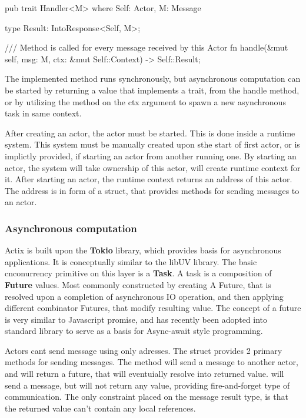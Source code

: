 \begin{code}[language=rust,label={handler_trait},caption={Handler trait}]
    pub trait Handler<M> where Self: Actor, M: Message
    {
    type Result: IntoResponse<Self, M>;

    /// Method is called for every message received by this Actor
    fn handle(&mut self, msg: M, ctx: &mut Self::Context) -> Self::Result;

    }
\end{code}

The implemented  method runs synchronously, but asynchronous computation
can be started by returning a value that implements a   trait, from the handle method, or by utilizing the 
method on the ctx argument to spawn a new asynchronous task in same context.

After creating an actor, the actor must be started. This is done inside a runtime system. This system must be manually created
upon sthe start of first actor, or is implictly provided, if starting an actor from another running one. By starting
an actor, the system will take ownership of this actor, will create runtime context for it. After starting an actor, the runtime
context returns an address of this actor. The address is in form of a struct, that provides methods for sending messages to
an actor.

\subsubsection{Asynchronous computation}
Actix is built upon the \textbf{Tokio} library, which provides basis for asynchronous applications. It is conceptually similar
to the libUV library. The basic cnconurrency primitive on this layer is a \textbf{Task}. A task is a composition
of \textbf{Future} values. Most commonly constructed by creating A Future, that is resolved upon a completion of asynchronous
IO operation, and then applying different combinator Futures, that modify resulting value. The concept of a future is very similar
to Javascript promise, and has recently been adopted into standard library to serve as a basis for Async-await style programming.

Actors cant send message using only adresses. The  struct provides 2 primary methods for sending messages.
The  method will send a message to another actor, and will return a future, that will eventuially resolve into
returned value.  will send a message, but will not return any value, providing fire-and-forget type of
communication. The only constraint placed on the message result type, is that the returned value can't contain any local
references.

